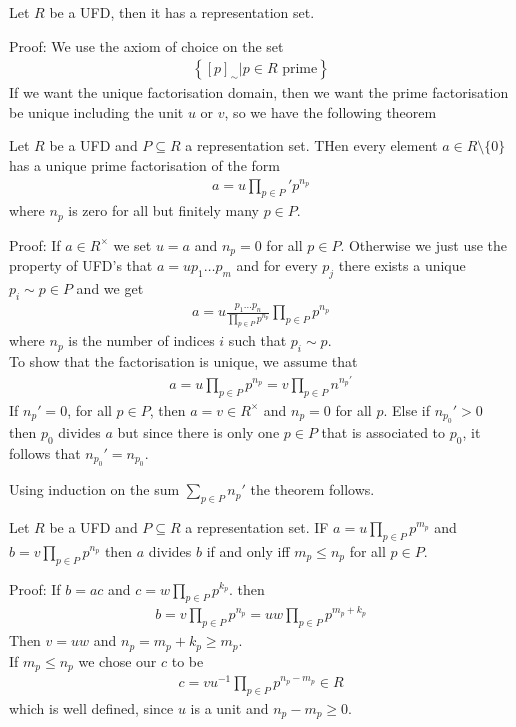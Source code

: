 \begin{lemma}[]
	Let $R$ be a UFD, then it has a representation set.
\end{lemma}
Proof: We use the axiom of choice on the set
\begin{align*}
	\left\{[p]_{\sim} \big\vert p \in R \text{ prime}\right\}
\end{align*}
If we want the unique factorisation domain, then we want the prime factorisation be unique including the unit $u$ or $v$, so we have the following theorem

\begin{theorem}[]
Let $R$ be a UFD and $P \subseteq R$ a representation set. THen every element $a \in R \setminus \{0\}$ has a unique prime factorisation of the form
\begin{align*}
	a = u \prod_{p \in P}' p^{n_p} 
\end{align*}
where $n_p$ is zero for all but finitely many $p \in P$.
\end{theorem}
Proof: If $a \in R^{\times}$ we set $u = a$ and $n_p = 0$ for all $p \in P$. Otherwise we just use the property of UFD's that $a = u p_1 \dots p_m$ and for every $p_j$ there exists a unique $p_i \sim p \in P$ and we get
\begin{align*}
	a = u \frac{p_1 \dots p_n}{\prod_{p \in P}p^{n_p}} \prod_{p \in P}p^{n_p}
\end{align*}
where $n_p$ is the number of indices $i$ such that $p_i \sim p$.\\
To show that the factorisation is unique, we assume that
\begin{align*}
	a = u \prod_{p \in P}p^{n_p} = v \prod_{p \in P}n^{n_p'}
\end{align*}
If $n_p' = 0$, for all $p \in P$, then $a = v \in R^{\times}$ and $n_p = 0$ for all $p$. Else if $n_{p_0}' > 0$ then $p_0$ divides $a$ but since there is only one $p \in P$ that is associated to $p_0$, it follows that $n_{p_0}' = n_{p_0}$.

Using induction on the sum $\sum_{p  \in P}n_{p}'$ the theorem follows.


\begin{lemma}[]
	Let $R$ be a UFD and $P \subseteq R$ a representation set. IF $a = u \prod_{p \in P}p^{m_p}$ and $b = v\prod_{p \in P}p^{n_p}$ then $a$ divides $b$ if and only iff $m_p \leq n_p$ for all $p \in P$.
\end{lemma}
Proof: If $b = ac$ and $c = w \prod_{p \in P}p^{k_p}$. then
\begin{align*}
	b = v \prod_{p \in P}p^{n_p} = uw \prod_{p \in P}p^{m_p + k_p}
\end{align*}
Then $v = uw$ and $n_p = m_p + k_p \geq m_p$.\\
If $m_p \leq n_p$ we chose our $c$ to be 
\begin{align*}
	c = vu^{-1} \prod_{p \in P} p^{n_p - m_p} \in R
\end{align*}
which is well defined, since $u$ is a unit and $n_p - m_p \geq 0$.

